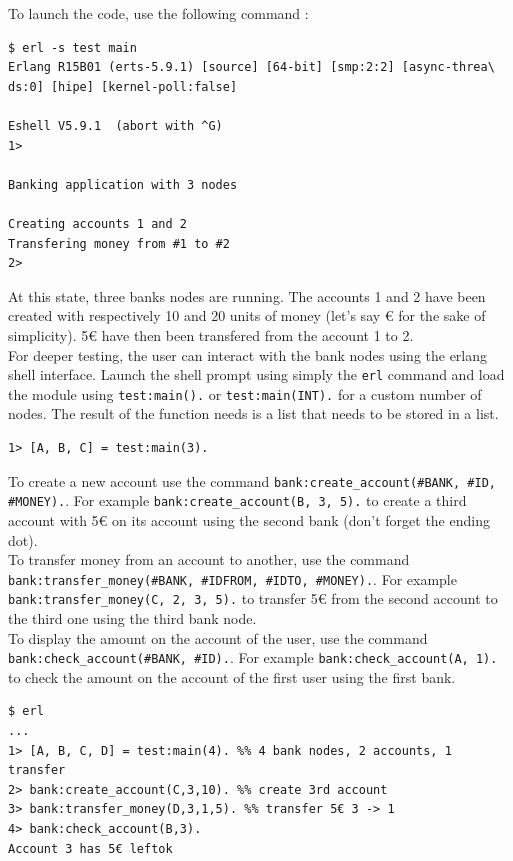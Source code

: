 \documentclass[11pt,english,a4paper]{article}
\begin{document}
To launch the code, use the following command :
\begin{verbatim}
$ erl -s test main
Erlang R15B01 (erts-5.9.1) [source] [64-bit] [smp:2:2] [async-threa\
ds:0] [hipe] [kernel-poll:false]

Eshell V5.9.1  (abort with ^G)
1>

Banking application with 3 nodes

Creating accounts 1 and 2
Transfering money from #1 to #2
2>
\end{verbatim}
At this state, three banks nodes are running.
The accounts 1 and 2 have been created with respectively 10 and 20 units of money (let's say € for the sake of simplicity).
5€ have then been transfered from the account 1 to 2.\\

For deeper testing, the user can interact with the bank nodes using the erlang shell interface.
Launch the shell prompt using simply the \texttt{erl} command and load the module using \texttt{test:main().} or \texttt{test:main(INT).} for a custom number of nodes.
The result of the function needs is a list that needs to be stored in a list.
\begin{verbatim}
1> [A, B, C] = test:main(3).
\end{verbatim}

To create a new account use the command \texttt{bank:create\_account(\#BANK, \#ID, \#MONEY).}.
For example \texttt{bank:create\_account(B, 3, 5).} to create a third account with 5€ on its account using the second bank (don't forget the ending dot).\\

To transfer money from an account to another, use the command  \texttt{bank:transfer\_money(\#BANK, \#IDFROM, \#IDTO, \#MONEY).}.
For example \texttt{bank:transfer\_money(C, 2, 3, 5).} to transfer 5€ from the second account to the third one using the third bank node.\\

To display the amount on the account of the user, use the command  \texttt{bank:check\_account(\#BANK, \#ID).}.
For example \texttt{bank:check\_account(A, 1).} to check the amount on the account of the first user using the first bank.\\

\begin{verbatim}
$ erl
...
1> [A, B, C, D] = test:main(4). %% 4 bank nodes, 2 accounts, 1 transfer
2> bank:create_account(C,3,10). %% create 3rd account
3> bank:transfer_money(D,3,1,5). %% transfer 5€ 3 -> 1
4> bank:check_account(B,3).
Account 3 has 5€ leftok
\end{verbatim}
\end{document}
